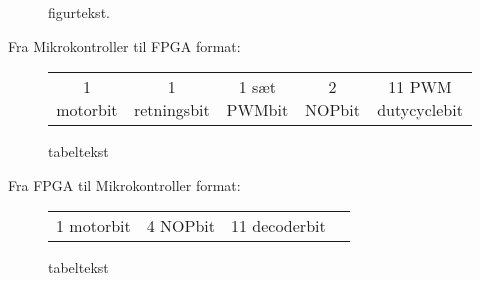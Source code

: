 \begin{figure}[!th]
\centering
\begin{tikzpicture}[node distance = 5 cm,scale=1]

\end{tikzpicture}
\caption[tekst i indholdsfortegnelsen]{figurtekst.}
\label{fig:FPGA_blok}
\end{figure}




Fra Mikrokontroller til FPGA format:
\begin{figure}[th!]
\centering
\begin{tabular}{c|c|c|c|c}
1 motorbit &1 retningsbit & 1 sæt PWMbit & 2 NOPbit & 11 PWM dutycyclebit

\end{tabular}
\captionsetup{type=figure}
\caption[tekst i indholdsfortegnelsen]{tabeltekst}
\label{tb:}
\end{figure}




Fra FPGA til Mikrokontroller format:
\begin{figure}[th!]
\centering
\begin{tabular}{c|c|c|c}
1 motorbit & 4 NOPbit & 11 decoderbit

\end{tabular}
\captionsetup{type=figure}
\caption[tekst i indholdsfortegnelsen]{tabeltekst}
\label{tb:}
\end{figure}
